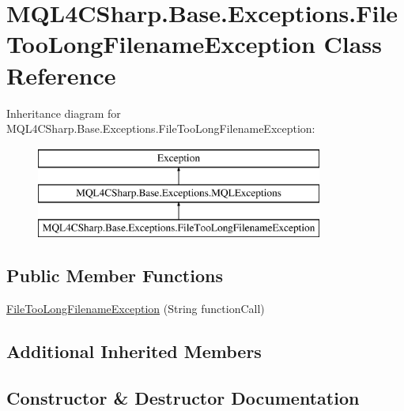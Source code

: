 \hypertarget{class_m_q_l4_c_sharp_1_1_base_1_1_exceptions_1_1_file_too_long_filename_exception}{}\section{M\+Q\+L4\+C\+Sharp.\+Base.\+Exceptions.\+File\+Too\+Long\+Filename\+Exception Class Reference}
\label{class_m_q_l4_c_sharp_1_1_base_1_1_exceptions_1_1_file_too_long_filename_exception}
Inheritance diagram for M\+Q\+L4\+C\+Sharp.\+Base.\+Exceptions.\+File\+Too\+Long\+Filename\+Exception\+:\begin{figure}[H]
\begin{center}
\leavevmode
\includegraphics[height=3.000000cm]{class_m_q_l4_c_sharp_1_1_base_1_1_exceptions_1_1_file_too_long_filename_exception}
\end{center}
\end{figure}
\subsection*{Public Member Functions}
\begin{DoxyCompactItemize}
\item 
\hyperlink{class_m_q_l4_c_sharp_1_1_base_1_1_exceptions_1_1_file_too_long_filename_exception_a511924ae1c4395015cad71a2612fe7b6}{File\+Too\+Long\+Filename\+Exception} (String function\+Call)
\end{DoxyCompactItemize}
\subsection*{Additional Inherited Members}


\subsection{Constructor \& Destructor Documentation}
